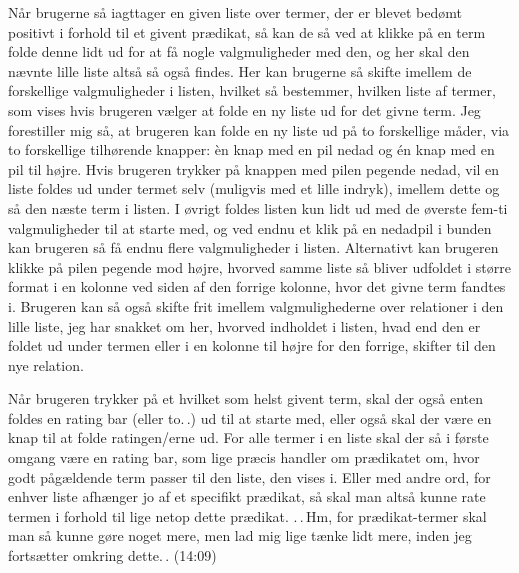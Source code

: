 \documentclass{report}
\begin{document}
Når brugerne så iagttager en given liste over termer, der er blevet bedømt positivt i forhold til et givent prædikat, så kan de så ved at klikke på en term folde denne lidt ud for at få nogle valgmuligheder med den, og her skal den nævnte lille liste altså så også findes. Her kan brugerne så skifte imellem de forskellige valgmuligheder i listen, hvilket så bestemmer, hvilken liste af termer, som vises hvis brugeren vælger at folde en ny liste ud for det givne term. Jeg forestiller mig så, at brugeren kan folde en ny liste ud på to forskellige måder, via to forskellige tilhørende knapper: èn knap med en pil nedad og én knap med en pil til højre. Hvis brugeren trykker på knappen med pilen pegende nedad, vil en liste foldes ud under termet selv (muligvis med et lille indryk), imellem dette og så den næste term i listen. I øvrigt foldes listen kun lidt ud med de øverste fem-ti valgmuligheder til at starte med, og ved endnu et klik på en nedadpil i bunden kan brugeren så få endnu flere valgmuligheder i listen. Alternativt kan brugeren klikke på pilen pegende mod højre, hvorved samme liste så bliver udfoldet i større format i en kolonne ved siden af den forrige kolonne, hvor det givne term fandtes i. Brugeren kan så også skifte frit imellem valgmulighederne over relationer i den lille liste, jeg har snakket om her, hvorved indholdet i listen, hvad end den er foldet ud under termen eller i en kolonne til højre for den forrige, skifter til den nye relation.

Når brugeren trykker på et hvilket som helst givent term, skal der også enten foldes en rating bar (eller to.\,.) ud til at starte med, eller også skal der være en knap til at folde ratingen/erne ud. For alle termer i en liste skal der så i første omgang være en rating bar, som lige præcis handler om prædikatet om, hvor godt pågældende term passer til den liste, den vises i. Eller med andre ord, for enhver liste afhænger jo af et specifikt prædikat, så skal man altså kunne rate termen i forhold til lige netop dette prædikat. .\,.\,Hm, for prædikat-termer skal man så kunne gøre noget mere, men lad mig lige tænke lidt mere, inden jeg fortsætter omkring dette.\,. (14:09)
\end{document}
